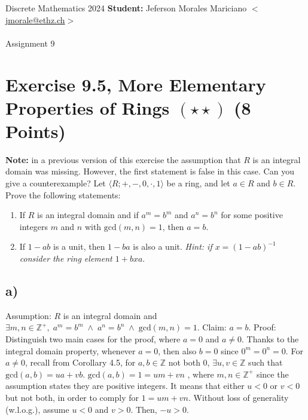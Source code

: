 \documentclass[unicode,11pt,a4paper,oneside,numbers=endperiod,openany]{scrartcl}
\def\Z{\mathbb{Z}}
\def\gcd{\textrm{gcd}}
\begin{document}
\setassignment
{}

\serieheader
{Discrete Mathematics}
{2024}
{%
\textbf{Student:} Jeferson Morales Mariciano 
\href{mailto:jmorale@ethz.ch}{\(<\)jmorale@ethz.ch\(>\)} \\\\}
{\vspace{-1cm}}%
{Assignment 9}{}

\section*{Exercise 9.5, More Elementary Properties of Rings \( (\star \star) \) \hfill (8 Points)}
\textbf{Note:} in a previous version of this exercise the assumption that 
\( R \) is an integral domain was missing.
However, the first statement is false in this case.
Can you give a counterexample? \newline
\noindent Let \( \langle R; +, -, 0, \cdot, 1 \rangle \) be a ring,
and let \( a \in R \) and \( b \in R \). 
Prove the following statements:

\begin{enumerate}[label=\textbf{\alph*)}]
    \item 
    If \( R \) is an integral domain and if \( a^m = b^m \) and \( a^n = b^n \) 
    for some positive integers \( m \) and \( n \) with \( \gcd(m,n) = 1 \),
    then \( a = b \).

    \item 
    If \( 1 - ab \) is a unit, then \( 1 - ba \) is also a unit. 
    \textit{Hint: if \( x = (1 - ab)^{-1} \) consider the ring element \( 1 + bxa \)}.

\end{enumerate}

\subsection*{a)}
Assumption: \( R \) is an integral domain and 
    \( \exists m, n \in \Z^+, \; a^m = b^m \; \land \; a^n = b^n \; \land \; \gcd(m,n) = 1 \). 
    \newline
Claim: \( a = b \). \newline
Proof: \newline
Distinguish two main cases for the proof, where \( a = 0 \) and \( a \neq 0 \). \newline
Thanks to the integral domain property, 
whenever \( a = 0 \), then also \( b = 0 \) since \( 0^m = 0^n = 0 \). \newline
For \( a \neq 0 \), 
recall from Corollary 4.5, for \( a, b \in \Z \) not both 0, \( \exists u, v \in \Z \) such that
\( \gcd(a, b) = ua + vb \).
\( \gcd(a, b) = 1 = um + vn \) , where \( m, n \in \Z^+ \) 
since the assumption states they are positive integers. \newline
It means that either \( u < 0 \) or \( v < 0 \) but not both,
in order to comply for \( 1 = um + vn \). \newline
Without loss of generality (w.l.o.g.), assume \( u < 0 \) and \( v > 0 \).
Then, \( -u > 0 \).
\end{document}

